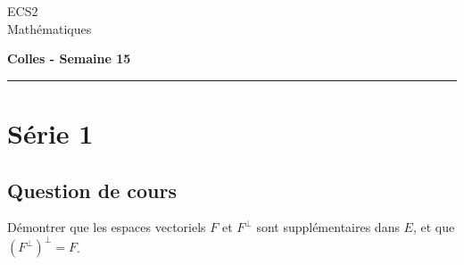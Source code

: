 \documentclass[11pt]{article}%
\begin{document}
\begin{flushleft}
ECS2 \\
Mathématiques
\end{flushleft}

\begin{center}
\textbf{\Large{Colles - Semaine 15}}
\end{center}

\hrule

\vspace*{0,2cm}

\section*{Série 1}
\subsection*{Question de cours}
\noindent
Démontrer que les espaces vectoriels $F$ et $F^\perp$ sont 
supplémentaires dans $E$, et que $(F^\perp)^\perp=F$.
\end{document}
